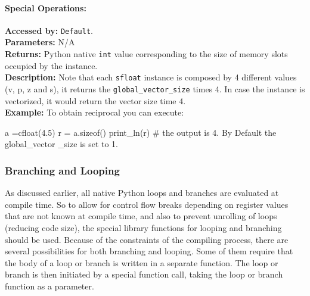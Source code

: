 \begin{mylisting}
\paragraph{Special Operations:}
                        \textbf{Accessed by:} \verb|Default|. \\
                        \textbf{Parameters:} N/A \\
                        \textbf{Returns:}
                                 Python native \verb|int| value corresponding to the size of memory slots occupied by the instance. \\
                        \textbf{Description:}
                                Note that each \verb|sfloat| instance is composed by 4 
                                different values (v, p, z and s), 
                                it returns the \verb|global_vector_size| times 4. 
                                In case the instance is vectorized, 
                                it would return the vector size time 4.\\
                \textbf{Example:}
                    To obtain reciprocal you can execute:
                        \begin{mylisting}
                                a =cfloat(4.5)             
                                r = a.sizeof()
                                print_ln(r)  # the output is 4. By Default the global_vector
                                _size is set to 1.
                        \end{mylisting}

\subsubsection{Branching and Looping}
As discussed earlier, all native Python loops and branches are evaluated at
compile time. So to allow for control flow breaks depending on register values
that are not known at compile time, and also to prevent unrolling of loops
(reducing code size), the special
library functions for looping and branching should be used.
Because of the constraints of the compiling process, there are several
possibilities for both branching and looping.
Some of them require that the body of a loop or branch is written
in a separate function. The loop or branch is then initiated by a special
function call, taking the loop or branch function as a parameter.


\end{mylisting}
